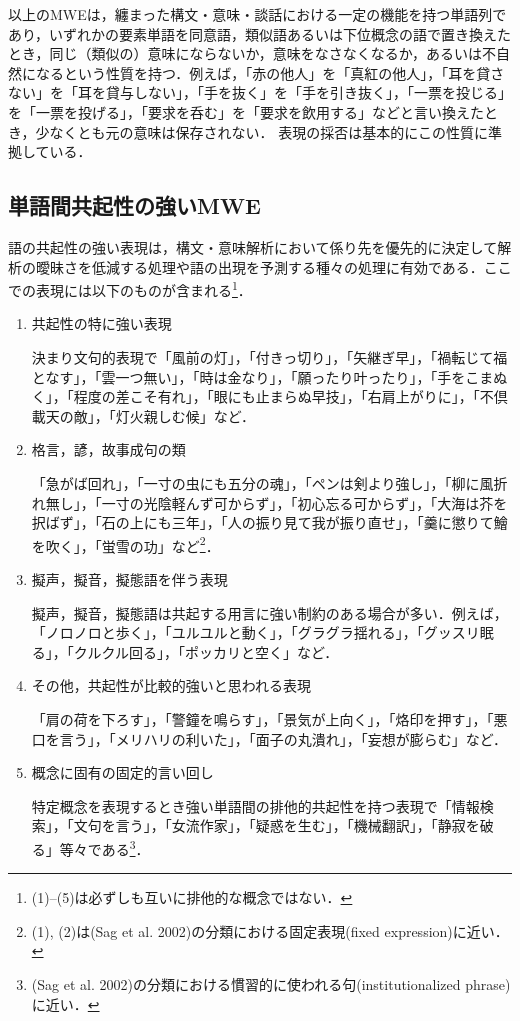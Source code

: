 \documentclass[japanese]{jnlp_1.4}
\begin{document}
以上のMWEは，纏まった構文・意味・談話における一定の機能を持つ単語列であり，いずれかの要素単語を同意語，類似語あるいは下位概念の語で置き換えたとき，同じ（類似の）意味にならないか，意味をなさなくなるか，あるいは不自然になるという性質を持つ．例えば，「赤の他人」を「真紅の他人」，「耳を貸さない」を「耳を貸与しない」，「手を抜く」を「手を引き抜く」，「一票を投じる」を「一票を投げる」，「要求を呑む」を「要求を飲用する」などと言い換えたとき，少なくとも元の意味は保存されない．
表現の採否は基本的にこの性質に準拠している．


\subsection{単語間共起性の強いMWE}

語の共起性の強い表現は，構文・意味解析において係り先を優先的に決定して解析の曖昧さを低減する処理や語の出現を予測する種々の処理に有効である．ここでの表現には以下のものが含まれる\footnote{(1)--(5)は必ずしも互いに排他的な概念ではない．}． 

\begin{enumerate}
\item  共起性の特に強い表現

決まり文句的表現で「風前の灯」，「付きっ切り」，「矢継ぎ早」，「禍転じて福となす」，「雲一つ無い」，「時は金なり」，「願ったり叶ったり」，「手をこまぬく」，「程度の差こそ有れ」，「眼にも止まらぬ早技」，「右肩上がりに」，「不倶載天の敵」，「灯火親しむ候」など． 

\item 格言，諺，故事成句の類

「急がば回れ」，「一寸の虫にも五分の魂」，「ペンは剣より強し」，「柳に風折れ無し」，「一寸の光陰軽んず可からず」，「初心忘る可からず」，「大海は芥を択ばず」，「石の上にも三年」，「人の振り見て我が振り直せ」，「羹に懲りて鱠を吹く」，「蛍雪の功」など\footnote{(1), (2)は(Sag et al. 2002)の分類における固定表現(fixed expression)に近い．}． 

\item 擬声，擬音，擬態語を伴う表現

擬声，擬音，擬態語は共起する用言に強い制約のある場合が多い．例えば，「ノロノロと歩く」，「ユルユルと動く」，「グラグラ揺れる」，「グッスリ眠る」，「クルクル回る」，「ポッカリと空く」など．

\item その他，共起性が比較的強いと思われる表現

「肩の荷を下ろす」，「警鐘を鳴らす」，「景気が上向く」，「烙印を押す」，「悪口を言う」，「メリハリの利いた」，「面子の丸潰れ」，「妄想が膨らむ」など．

\item 概念に固有の固定的言い回し

特定概念を表現するとき強い単語間の排他的共起性を持つ表現で「情報検索」，「文句を言う」，「女流作家」，「疑惑を生む」，「機械翻訳」，「静寂を破る」等々である\footnote{(Sag et al. 2002)の分類における慣習的に使われる句(institutionalized phrase)に近い．}． 
\end{enumerate}
\end{document}
